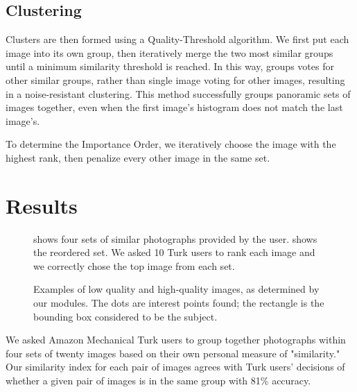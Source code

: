 \documentclass{sig-alternate}
\begin{document}
\subsection{Clustering}
Clusters are then formed using a Quality-Threshold algorithm. We first put each image into its own group, then iteratively merge the two most similar groups until a minimum similarity threshold is reached. In this way, groups votes for other similar groups, rather than single image voting for other images, resulting in a noise-resistant clustering. This method successfully groups panoramic sets of images together, even when the first image's histogram does not match the last image's. %

To determine the Importance Order, we iteratively choose the image with the highest rank, then penalize every other image in the same set.

\section{Results}

\begin{figure*}[t!]
\centering
{}
\caption{ shows four sets of similar photographs provided by the user.  shows the reordered set. We asked 10 Turk users to rank each image and we correctly chose the top image from each set.}
\label{fig:ResultSorting}
\end{figure*}

\begin{figure*}[t!]
\centering
{}
\caption{Examples of  low quality and  high-quality images, as determined by our modules. The dots are interest points found; the rectangle is the bounding box considered to be the subject.}
\label{fig:Examples}
\end{figure*}

We asked Amazon Mechanical Turk users to group together photographs within four sets of twenty images based on their own personal measure of "similarity." Our similarity index for each pair of images agrees with Turk users' decisions of whether a given pair of images is in the same group with 81\% accuracy.
\end{document}
